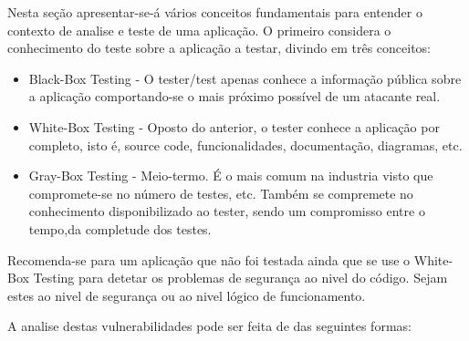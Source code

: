 	Nesta seção apresentar-se-á vários conceitos fundamentais para entender o contexto de analise e teste de uma aplicação. O primeiro considera o conhecimento do teste sobre a aplicação a testar, divindo em três conceitos:

\begin{itemize}

\item Black-Box Testing - O tester/test apenas conhece a informação pública sobre a aplicação comportando-se o mais próximo possível de um atacante real.

\item White-Box Testing - Oposto do anterior, o tester conhece a aplicação por completo, isto é, source code, funcionalidades, documentação, diagramas, etc.

\item Gray-Box Testing - Meio-termo. É o mais comum na industria visto que compromete-se no número de testes, etc. Também se compremete no conhecimento disponibilizado ao tester, sendo um compromisso entre o tempo,da completude dos testes.

\end{itemize}

Recomenda-se para um aplicação que não foi testada ainda que se use o White-Box Testing para detetar os problemas de segurança ao nivel do código. Sejam estes ao nivel de segurança ou ao nivel lógico de funcionamento.

A analise destas vulnerabilidades pode ser feita de das seguintes formas:

